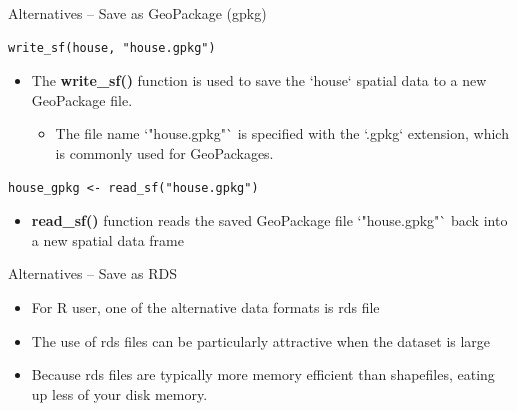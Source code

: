 \documentclass[hyperref={pdfpagelabels=false}]{beamer}
\begin{document}
\begin{frame}[fragile]{Alternatives -- Save as GeoPackage (gpkg)}
\begin{lstlisting}
write_sf(house, "house.gpkg")
\end{lstlisting}
\begin{itemize}
	\item The \textbf{write\_sf()} function is used to save the `house` spatial data to a new GeoPackage file.
	\vspace{0.2cm}
	\begin{itemize}
		\item The file name `"house.gpkg"` is specified with the `.gpkg` extension, which is commonly used for GeoPackages.
	\end{itemize}
\end{itemize}

\begin{lstlisting}
house_gpkg <- read_sf("house.gpkg")
\end{lstlisting}
\begin{itemize}
	\item \textbf{read\_sf()} function reads the saved GeoPackage file `"house.gpkg"` back into a new spatial data frame
\end{itemize}
\end{frame}





\begin{frame}[fragile]{Alternatives -- Save as RDS}
	\begin{itemize}
		
		\item For R user, one of the alternative data formats  is  rds file
		\vspace{0.2cm}
		\item The use of rds files can be particularly attractive when the dataset is large 
		\vspace{0.2cm}
		\item Because rds files are typically more memory efficient than shapefiles, eating up less of your disk memory.
		
		
	\end{itemize}
\end{frame}
\end{document}
